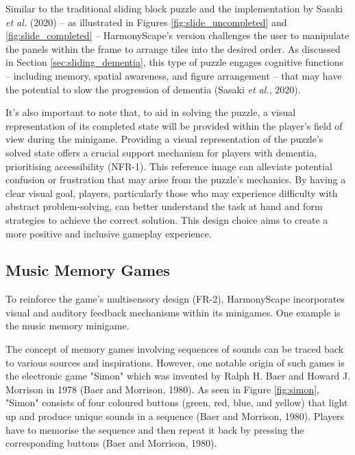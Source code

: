 \documentclass{l4proj}
\begin{document}
Similar to the traditional sliding block puzzle and the implementation by Sasaki \emph{et al.} (2020) – as illustrated in Figures \ref{fig:slide_uncompleted} and \ref{fig:slide_completed} – HarmonyScape's version challenges the user to manipulate the panels within the frame to arrange tiles into the desired order. As discussed in Section \ref{sec:sliding_dementia}, this type of puzzle engages cognitive functions – including memory, spatial awareness, and figure arrangement – that may have the potential to slow the progression of dementia (Sasaki \emph{et al.}, 2020).

It's also important to note that, to aid in solving the puzzle, a visual representation of its completed state will be provided within the player's field of view during the minigame. Providing a visual representation of the puzzle's solved state offers a crucial support mechanism for players with dementia, prioritising accessibility (NFR-1). This reference image can alleviate potential confusion or frustration that may arise from the puzzle's mechanics. By having a clear visual goal, players, particularly those who may experience difficulty with abstract problem-solving, can better understand the task at hand and form strategies to achieve the correct solution.  This design choice aims to create a more positive and inclusive gameplay experience.

\subsection{Music Memory Games}
To reinforce the game's multisensory design (FR-2), HarmonyScape incorporates visual and auditory feedback mechanisms within its minigames. One example is the music memory minigame. 

The concept of memory games involving sequences of sounds can be traced back to various sources and inspirations. However, one notable origin of such games is the electronic game "Simon" which was invented by Ralph H. Baer and Howard J. Morrison in 1978 (Baer and Morrison, 1980). As seen in Figure \ref{fig:simon}, "Simon" consists of four coloured buttons (green, red, blue, and yellow) that light up and produce unique sounds in a sequence (Baer and Morrison, 1980). Players have to memorise the sequence and then repeat it back by pressing the corresponding buttons (Baer and Morrison, 1980).

\end{document}

